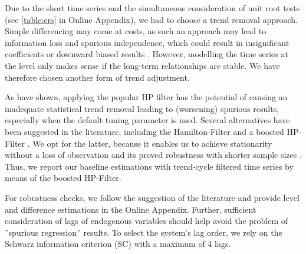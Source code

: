 Due to the short time series and the simultaneous consideration of unit root tests (see \ref{table:ers} in Online Appendix), we had to choose a trend removal approach. Simple differencing may come at costs, as such an approach may lead to information loss and spurious independence, which could result in insignificant coefficients or downward biased results \citep[201]{Kirchgaesser.2007}. However, modelling the time series at the level only makes sense if the long-term relationships are stable. We have therefore chosen another form of trend adjustment.

As \cite{hamilton.2018, phillips.2021b} have shown, applying the popular HP filter \citep{hodrick.1997} has the potential of causing an inadequate statistical trend removal leading to (worsening) spurious results, especially when the default tuning parameter is used. Several alternatives have been suggested in the literature, including the Hamilton-Filter \citep{hamilton.2018} and a boosted HP-Filter \citep{phillips.2021}. We opt for the latter, because it enables us to achieve stationarity without a loss of observation and its proved robustness with shorter sample sizes \citep{phillips.2021b}. Thus, we report our baseline estimations with trend-cycle filtered time series by means of the boosted HP-Filter. 

For robustness checks, we follow the suggestion of the literature \citep[159]{Kirchgaesser.2007} and provide level and difference estimations in the Online Appendix. Further, sufficient consideration of lags of endogenous variables should help avoid the problem of ''spurious regression'' results. To select the system's lag order, we rely on the Schwarz information criterion (SC) with a maximum of 4 lags.
 
